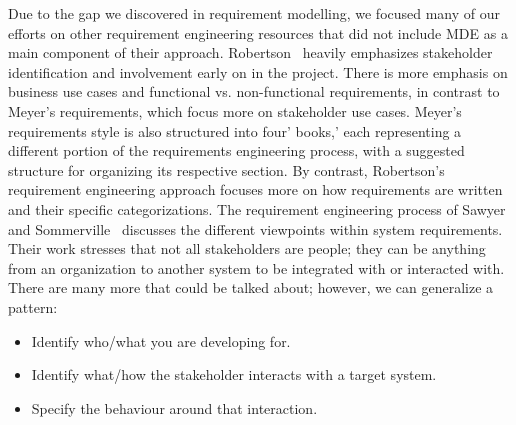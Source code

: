 
Due to the gap we discovered in requirement modelling, we focused many of our efforts on other requirement engineering resources that did not include \gls{MDE} as a main component of their approach. Robertson~\cite{robertson2012mastering, robertson2000volere} heavily emphasizes stakeholder identification and involvement early on in the project. There is more emphasis on business use cases and functional vs. non-functional requirements, in contrast to Meyer's requirements, which focus more on stakeholder use cases. Meyer's requirements style is also structured into four' books,' each representing a different portion of the requirements engineering process, with a suggested structure for organizing its respective section. By contrast, Robertson's requirement engineering approach focuses more on how requirements are written and their specific categorizations. The requirement engineering process of Sawyer and Sommerville~\cite{sommerville1997requirements, sommerville1997viewpoints} discusses the different viewpoints within system requirements. Their work stresses that not all stakeholders are people; they can be anything from an organization to another system to be integrated with or interacted with. There are many more that could be talked about; however, we can generalize a pattern:
\begin{itemize}
	\item Identify who/what you are developing for.
	\item Identify what/how the stakeholder interacts with a target system.
	\item Specify the behaviour around that interaction.
\end{itemize}

